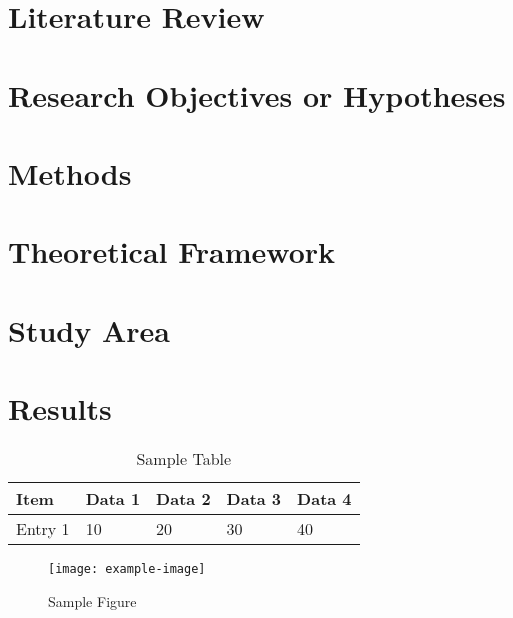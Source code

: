 \documentclass[12pt]{article}
\begin{document}
\section{Literature Review}
\lipsum[3-4] %

\newpage
\section{Research Objectives or Hypotheses}
\lipsum[5-6] %

\newpage
\section{Methods}
\lipsum[3-4] %

\newpage
\section{Theoretical Framework}
\lipsum[5-6] %

\newpage
\section{Study Area}
\lipsum[5-6] %

\newpage
\section{Results}
\lipsum[7-8] %

\vspace{2\baselineskip} %
\begin{table}[h]
    \centering
    \caption{Sample Table}
    \begin{tabularx}{\textwidth}{|l|X|X|X|X|}
        \hline
        \textbf{Item} & \textbf{Data 1} & \textbf{Data 2} & \textbf{Data 3} & \textbf{Data 4} \\
        \hline
        Entry 1 & 10 & 20 & 30 & 40 \\
        \hline
    \end{tabularx}
\end{table}
\vspace{2\baselineskip} %

\vspace{2\baselineskip} %
\begin{figure}[h]
    \centering
    \texttt{[image: example-image]}
    \caption{Sample Figure}
\end{figure}
\vspace{2\baselineskip} %
\end{document}
